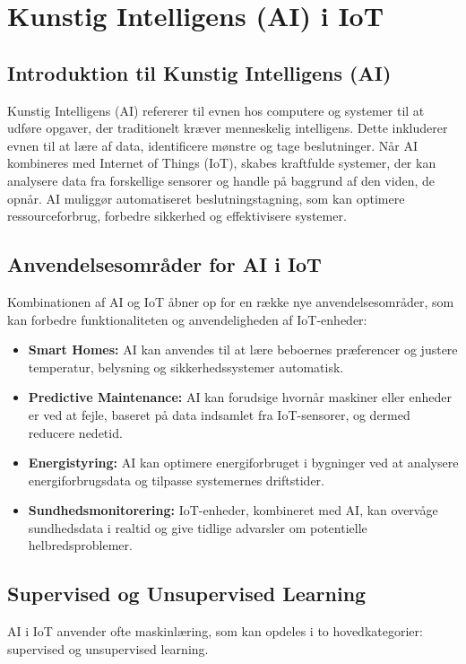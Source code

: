 \documentclass[12pt,a4paper]{book}
\begin{document}
	\section{Kunstig Intelligens (AI) i IoT}
	\subsection{Introduktion til Kunstig Intelligens (AI)}
	Kunstig Intelligens (AI) refererer til evnen hos computere og systemer til at udføre opgaver, der traditionelt kræver menneskelig intelligens. Dette inkluderer evnen til at lære af data, identificere mønstre og tage beslutninger. Når AI kombineres med Internet of Things (IoT), skabes kraftfulde systemer, der kan analysere data fra forskellige sensorer og handle på baggrund af den viden, de opnår. AI muliggør automatiseret beslutningstagning, som kan optimere ressourceforbrug, forbedre sikkerhed og effektivisere systemer.
	
	\subsection{Anvendelsesområder for AI i IoT}
	Kombinationen af AI og IoT åbner op for en række nye anvendelsesområder, som kan forbedre funktionaliteten og anvendeligheden af IoT-enheder:
	\begin{itemize}
		\item \textbf{Smart Homes:} AI kan anvendes til at lære beboernes præferencer og justere temperatur, belysning og sikkerhedssystemer automatisk.
		\item \textbf{Predictive Maintenance:} AI kan forudsige hvornår maskiner eller enheder er ved at fejle, baseret på data indsamlet fra IoT-sensorer, og dermed reducere nedetid.
		\item \textbf{Energistyring:} AI kan optimere energiforbruget i bygninger ved at analysere energiforbrugsdata og tilpasse systemernes driftstider.
		\item \textbf{Sundhedsmonitorering:} IoT-enheder, kombineret med AI, kan overvåge sundhedsdata i realtid og give tidlige advarsler om potentielle helbredsproblemer.
	\end{itemize}
	
	\subsection{Supervised og Unsupervised Learning}
	AI i IoT anvender ofte maskinlæring, som kan opdeles i to hovedkategorier: supervised og unsupervised learning.
	
\end{document}
